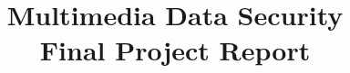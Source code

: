 \documentclass[10pt]{beamer}
\title[Final Project Report]{Multimedia Data Security\\Final Project Report}
\author[Chistè, Facchinetti, Franzil]{%
	\texorpdfstring{%
		\begin{columns}
			\column{.33\linewidth}
			\centering
			Paolo Chistè
			\column{.33\linewidth}
			\centering
			Claudio Facchinetti
			\column{.33\linewidth}
			\centering
			Matteo Franzil
		\end{columns}
	}{Chistè, Facchinetti, Franzil}
}
\institute{University of Trento}
\begin{document}
\begin{frame}
\maketitle
\end{frame}

\end{document}
